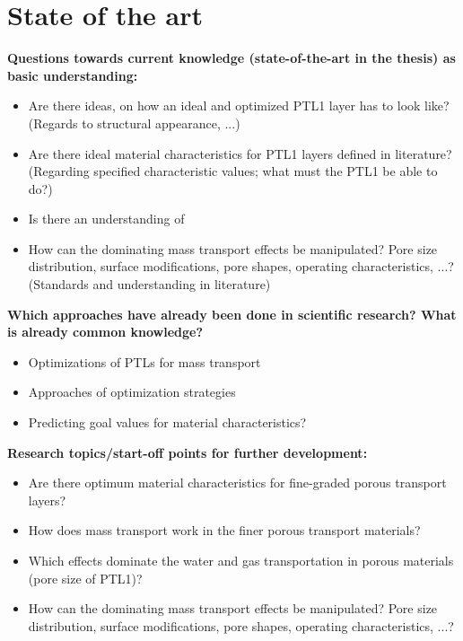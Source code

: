 \chapter{State of the art}
\label{sec:state-of-art}
\textbf{Questions towards current knowledge (state-of-the-art in the thesis) as basic understanding:}
\begin{itemize}
    \item Are there ideas, on how an ideal and optimized \acs{PTL}1 layer has to look like? (Regards to structural appearance, ...)
    \item Are there ideal material characteristics for PTL1 layers defined in literature? (Regarding specified characteristic values; what must the PTL1 be able to do?)
    \item Is there an understanding of 
    \item How can the dominating mass transport effects be manipulated? Pore size distribution, surface modifications, pore shapes, operating characteristics, ...? (Standards and understanding in literature)
\end{itemize}

\textbf{Which approaches have already been done in scientific research? What is already common knowledge?}
\begin{itemize}
    \item Optimizations of PTLs for mass transport
    \item Approaches of optimization strategies
    \item Predicting goal values for material characteristics?
\end{itemize}

\textbf{Research topics/start-off points for further development:}
\begin{itemize}
    \item Are there optimum material characteristics for fine-graded porous transport layers?
    \item How does mass transport work in the finer porous transport materials?
    \item Which effects dominate the water and gas transportation in porous materials (pore size of PTL1)?
    \item How can the dominating mass transport effects be manipulated? Pore size distribution, surface modifications, pore shapes, operating characteristics, ...?
\end{itemize}

